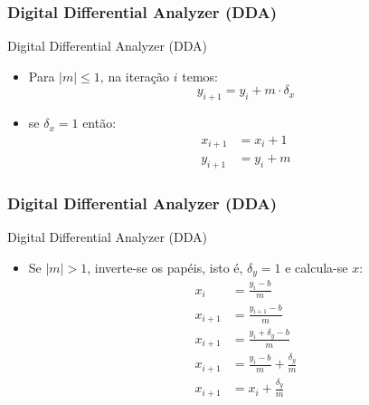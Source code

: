 \documentclass{beamer}
\begin{document}
\begin{frame}
\frametitle{Digital Differential Analyzer (DDA)}

		\begin{block}{Digital Differential Analyzer (DDA)}
		\begin{itemize}
			\item Para $|m| \leq 1$, na iteração $i$ temos:
				\begin{equation*}
					y_{i+1} = y_i + m \cdot \delta_x
				\end{equation*}

			\item se $\delta_x = 1$ então:
				\begin{align*}
					x_{i+1} &= x_i + 1\\
					y_{i+1} &= y_i + m 
				\end{align*}
		\end{itemize}
	\end{block}
	
\end{frame}

\begin{frame}
\frametitle{Digital Differential Analyzer (DDA)}

		\begin{block}{Digital Differential Analyzer (DDA)}
		\begin{itemize}
			\item Se $|m| > 1$, inverte-se os papéis, isto é, $\delta_y = 1$ e calcula-se $x$:
			\begin{align*}
				x_i 		&= \frac{y_i-b}{m} \\
				x_{i+1}	&= \frac{y_{i+1}-b}{m}\\
				x_{i+1}	&= \frac{y_i+\delta_y -b}{m}\\
				x_{i+1}	&= \frac{y_i-b}{m} + \frac{\delta_y}{m}\\
				x_{i+1}	&= x_i + \frac{\delta_y}{m}
			\end{align*}
		\end{itemize}
	\end{block}
\end{frame}
\end{document}
